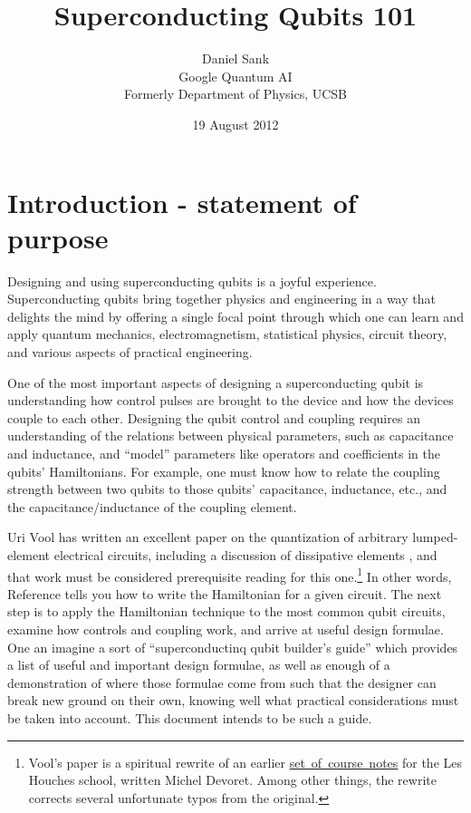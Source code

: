 \documentclass[twocolumn]{article}
\title{Superconducting Qubits 101}
\author{Daniel Sank \\
\small Google Quantum AI \\
\small Formerly Department of Physics, UCSB}
\date{19 August 2012}
\begin{document}
\maketitle
\tableofcontents

\section{Introduction - statement of purpose}

Designing and using superconducting qubits is a joyful experience.
Superconducting qubits bring together physics and engineering in a way that delights the mind by offering a single focal point through which one can learn and apply quantum mechanics, electromagnetism, statistical physics, circuit theory, and various aspects of practical engineering.

One of the most important aspects of designing a superconducting qubit is understanding how control pulses are brought to the device and how the devices couple to each other.
Designing the qubit control and coupling requires an understanding of the relations between physical parameters, such as capacitance and inductance, and ``model'' parameters like operators and coefficients in the qubits' Hamiltonians.
For example, one must know how to relate the coupling strength between two qubits to those qubits' capacitance, inductance, etc., and the capacitance/inductance of the coupling element.

Uri Vool has written an excellent paper on the quantization of arbitrary lumped-element electrical circuits, including a discussion of dissipative elements \cite{Vool:quantumCircuits}, and that work must be considered prerequisite reading for this one.\footnote{Vool's paper is a spiritual rewrite of an earlier \mbox{\href{http://qulab.eng.yale.edu/documents/reprints/Houches_fluctuations.pdf}{set of course notes}} for the Les Houches school, written Michel Devoret. Among other things, the rewrite corrects several unfortunate typos from the original.}
In other words, Reference \cite{Vool:quantumCircuits} tells you how to write the Hamiltonian for a given circuit.
The next step is to apply the Hamiltonian technique to the most common qubit circuits, examine how controls and coupling work, and arrive at useful design formulae.
One an imagine a sort of ``superconductinq qubit builder's guide'' which provides a list of useful and important design formulae, as well as enough of a demonstration of where those formulae come from such that the designer can break new ground on their own, knowing well what practical considerations must be taken into account.
This document intends to be such a guide.
\end{document}
